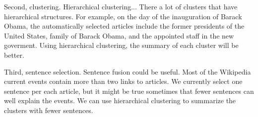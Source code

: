 \documentclass[11pt]{article}
\begin{document}
Second, clustering.
Hierarchical clustering... There a lot of clusters that have hierarchical structures. For example, on the day of the
inauguration of Barack Obama, the automatically selected articles include
the former presidents of the United States, family of Barack Obama,
and the appointed staff in the new goverment.
Using hierarchical clustering, the summary of each cluster will be better.

Third, sentence selection. Sentence fusion could be useful. Most of the Wikipedia current events 
contain more than two links to articles. We currently select one sentence per each article,
but it might be true sometimes that fewer sentences can well explain the events.
We can use hierarchical clustering to summarize the clusters with fewer sentences.






\end{document}
